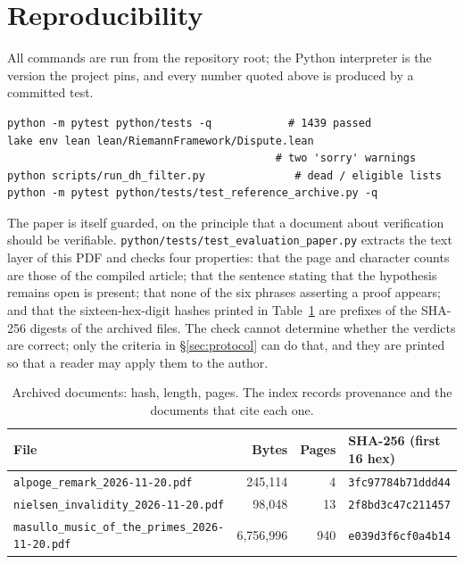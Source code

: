 \documentclass[11pt,a4paper]{article}
\begin{document}
\appendix
\section{Reproducibility}

All commands are run from the repository root; the Python interpreter is the version the
project pins, and every number quoted above is produced by a committed test.

\begin{verbatim}
python -m pytest python/tests -q            # 1439 passed
lake env lean lean/RiemannFramework/Dispute.lean
                                          # two 'sorry' warnings
python scripts/run_dh_filter.py              # dead / eligible lists
python -m pytest python/tests/test_reference_archive.py -q
\end{verbatim}

The paper is itself guarded, on the principle that a document about verification should be
verifiable. \texttt{python/tests/test\_evaluation\_paper.py} extracts the text layer of this PDF and
checks four properties: that the page and character counts are those of the compiled article; that
the sentence stating that the hypothesis remains open is present; that none of the six phrases
asserting a proof appears; and that the sixteen-hex-digit hashes printed in
Table~\ref{tab:hashes} are prefixes of the SHA-256 digests of the archived files. The check cannot
determine whether the verdicts are correct; only the criteria in \S\ref{sec:protocol} can do that,
and they are printed so that a reader may apply them to the author.

\begin{table}[htbp]
\centering
\caption{Archived documents: hash, length, pages. The index records provenance and the
documents that cite each one.}
\label{tab:hashes}
\footnotesize
\begin{tabular}{@{}lrrl@{}}
\toprule
File & Bytes & Pages & SHA-256 (first 16 hex) \\
\midrule
\texttt{alpoge\_remark\_2026-11-20.pdf} & 245{,}114 & 4 & \texttt{3fc97784b71ddd44} \\
\texttt{nielsen\_invalidity\_2026-11-20.pdf} & 98{,}048 & 13 & \texttt{2f8bd3c47c211457} \\
\texttt{masullo\_music\_of\_the\_primes\_2026-11-20.pdf} & 6{,}756{,}996 & 940 &
  \texttt{e039d3f6cf0a4b14} \\
\bottomrule
\end{tabular}
\end{table}
\end{document}
